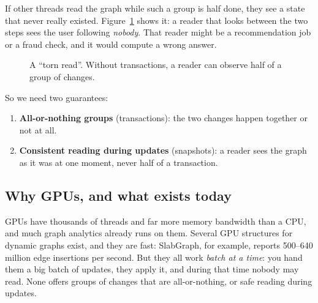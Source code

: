 \documentclass[11pt,a4paper]{article}
\begin{document}
If other threads read the graph while such a group is half done, they see a state that never really existed.
Figure~\ref{fig:torn} shows it: a reader that looks between the two steps sees the user following \emph{nobody}. That
reader might be a recommendation job or a fraud check, and it would compute a wrong answer.

\begin{figure}[H]
\centering
{}
\caption{A ``torn read''. Without transactions, a reader can observe half of a group of changes.}
\label{fig:torn}
\end{figure}

So we need two guarantees:
\begin{enumerate}
\item \textbf{All-or-nothing groups} (transactions): the two changes happen together or not at all.
\item \textbf{Consistent reading during updates} (snapshots): a reader sees the graph as it was at one moment, never
  half of a transaction.
\end{enumerate}

\subsection{Why GPUs, and what exists today}
GPUs have thousands of threads and far more memory bandwidth than a CPU, and much graph analytics already runs on them.
Several GPU structures for dynamic graphs exist, and they are fast: SlabGraph, for example, reports 500--640 million
edge insertions per second. But they all work \emph{batch at a time}: you hand them a big batch of updates, they apply
it, and during that time nobody may read. None offers groups of changes that are all-or-nothing, or safe reading
during updates.
\end{document}
